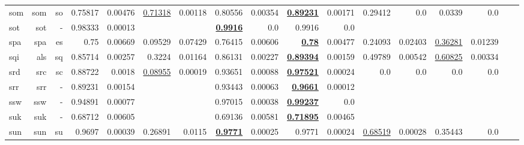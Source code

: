 \documentclass[11pt]{article}
\begin{document}
\begin{table*}[h]
{\begin{tabular}{lrrrrrrrrrrrrrrrr}
som         & som         & so         & 0.75817         & 0.00476         & \underline{0.71318}         & 0.00118         & 0.80556         & 0.00354         & \textbf{\underline{0.89231}}         & 0.00171         & 0.29412         & 0.0         & 0.0339         & 0.0         \\
sot         & sot         & -         & 0.98333         & 0.00013         &          &          & \textbf{\underline{0.9916}}         & 0.0         & 0.9916         & 0.0         &          &          &          &          \\
spa         & spa         & es         & 0.75         & 0.00669         & 0.09529         & 0.07429         & 0.76415         & 0.00606         & \textbf{\underline{0.78}}         & 0.00477         & 0.24093         & 0.02403         & \underline{0.36281}         & 0.01239         \\
sqi         & als         & sq         & 0.85714         & 0.00257         & 0.3224         & 0.01164         & 0.86131         & 0.00227         & \textbf{\underline{0.89394}}         & 0.00159         & 0.49789         & 0.00542         & \underline{0.60825}         & 0.00334         \\
srd         & src         & sc         & 0.88722         & 0.0018         & \underline{0.08955}         & 0.00019         & 0.93651         & 0.00088         & \textbf{\underline{0.97521}}         & 0.00024         & 0.0         & 0.0         & 0.0         & 0.0         \\
srr         & srr         & -         & 0.89231         & 0.00154         &          &          & 0.93443         & 0.00063         & \textbf{\underline{0.9661}}         & 0.00012         &          &          &          &          \\
ssw         & ssw         & -         & 0.94891         & 0.00077         &          &          & 0.97015         & 0.00038         & \textbf{\underline{0.99237}}         & 0.0         &          &          &          &          \\
suk         & suk         & -         & 0.68712         & 0.00605         &          &          & 0.69136         & 0.00581         & \textbf{\underline{0.71895}}         & 0.00465         &          &          &          &          \\
sun         & sun         & su         & 0.9697         & 0.00039         & 0.26891         & 0.0115         & \textbf{\underline{0.9771}}         & 0.00025         & 0.9771         & 0.00024         & \underline{0.68519}         & 0.00028         & 0.35443         & 0.0         \\

\end{tabular}}
\end{table*}
\end{document}
